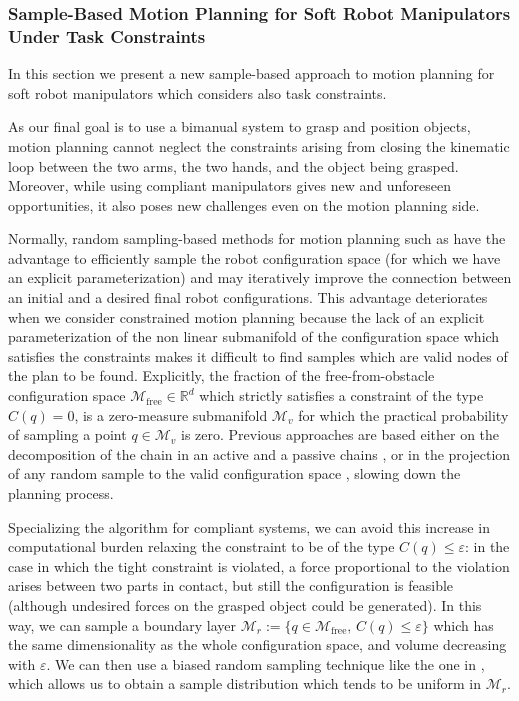 
\subsubsection{Sample-Based Motion Planning for Soft Robot Manipulators
Under Task Constraints} 
\label{sec:SampleBasedMotionPlanningSoftRobots}

In this section we present a new sample-based approach to motion planning for soft robot manipulators which considers also task constraints.

As our final goal is to use a bimanual system to grasp and position objects, motion planning cannot neglect the constraints arising from closing the kinematic loop between the two arms, the two hands, and the object being grasped. Moreover, while using compliant manipulators gives new and unforeseen opportunities, it also poses new challenges even on the motion planning side.

Normally, random sampling-based methods for motion planning such as \cite{kavraki1996probabilistic,lavalle1998rapidly} have the advantage to efficiently sample the robot configuration space (for which we have an explicit parameterization) and may iteratively improve the connection between an initial and a desired final robot configurations.
This advantage deteriorates when we consider constrained motion planning because the lack of an explicit parameterization of the non linear submanifold of the configuration space which satisfies the constraints makes it difficult to find samples which are valid nodes of the plan to be found.
Explicitly, the fraction of the free-from-obstacle configuration space $ \mathcal{M}_{\text{free}} \in \mathbb{R}^{d} $ which strictly satisfies a constraint of the type $ C(q) = 0 $, is a zero-measure submanifold $ \mathcal{M}_{v} $ for which the practical probability of sampling a point $ q \in \mathcal{M}_{v} $ is zero.
Previous approaches are based either on the decomposition of the chain in an active and a passive chains \cite{cortes2002random}, or in the projection of any random sample to the valid configuration space \cite{stilman2010global,berenson2011constrained}, slowing down the planning process.

Specializing the algorithm for compliant systems, we can avoid this increase in computational burden relaxing the constraint to be of the type $ C(q) \leq \varepsilon $: in the case in which the tight constraint is violated, a force proportional to the violation arises between two parts in contact, but still the configuration is feasible (although undesired forces on the grasped object could be generated).
In this way, we can sample a boundary layer $ \mathcal{M}_{r} := \{q \in \mathcal{M}_{\text{free}},\,C(q)\leq \varepsilon \} $ which has the same dimensionality as the whole configuration space, and volume decreasing with $ \varepsilon $.
We can then use a biased random sampling technique like the one in \cite{bialkowsky2013free}, which allows us to obtain a sample distribution which tends to be uniform in $ \mathcal{M}_{r} $.


